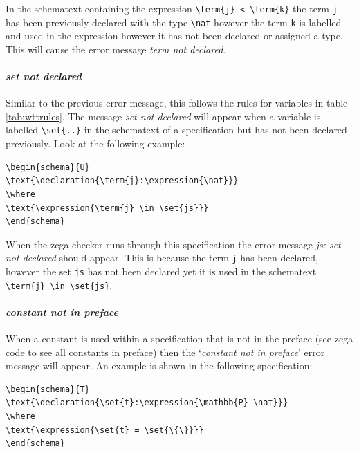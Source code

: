 In the schematext containing the expression \verb|\term{j} < \term{k}| the term
\verb|j| has been previously declared with the type \verb|\nat| however the term
\verb|k| is labelled and used in the expression however it has not been declared
or assigned a type. This will cause the error message \emph{term not declared}.

\paragraph{\emph{set not declared}}

Similar to the previous error message, this follows the rules for variables in
table \ref{tab:wttrules}. The message \emph{set not declared} will appear when a
variable is labelled \verb|\set{..}| in the schematext of a specification but has
not been declared previously. Look at the following example:

\begin{exam}
\begin{verbatim}       
\begin{schema}{U}
\text{\declaration{\term{j}:\expression{\nat}}}
\where
\text{\expression{\term{j} \in \set{js}}}
\end{schema}
\end{verbatim}
\end{exam}

When the \gls{zcga} checker runs through this specification the error message
\emph{js: set not declared} should appear. This is because the term \verb|j| has
been declared, however the set \verb|js| has not been declared yet it is used in
the schematext \\ \verb|\term{j} \in \set{js}|.

\paragraph{\emph{constant not in preface}}

When a constant is used within a specification that is not in the preface (see
\gls{zcga} code to see all constants in preface) then the `\emph{constant not in
preface}' error message will appear. An example is shown in the following
specification:

\begin{exam}
\begin{verbatim}       
\begin{schema}{T}
\text{\declaration{\set{t}:\expression{\mathbb{P} \nat}}}
\where
\text{\expression{\set{t} = \set{\{\}}}}
\end{schema}
\end{verbatim}
\end{exam}

